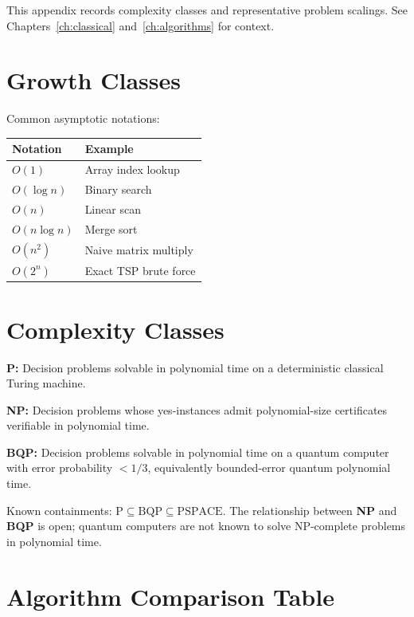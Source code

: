 This appendix records complexity classes and representative problem scalings. See Chapters~\ref{ch:classical} and~\ref{ch:algorithms} for context.

\section{Growth Classes}

Common asymptotic notations:
\begin{center}
\begin{tabular}{@{}ll@{}}
\toprule
Notation & Example \\
\midrule
$O(1)$ & Array index lookup \\
$O(\log n)$ & Binary search \\
$O(n)$ & Linear scan \\
$O(n\log n)$ & Merge sort \\
$O(n^2)$ & Naive matrix multiply \\
$O(2^n)$ & Exact TSP brute force \\
\bottomrule
\end{tabular}
\end{center}

\section{Complexity Classes}

\textbf{P:} Decision problems solvable in polynomial time on a deterministic classical Turing machine.

\textbf{NP:} Decision problems whose yes-instances admit polynomial-size certificates verifiable in polynomial time.

\textbf{BQP:} Decision problems solvable in polynomial time on a quantum computer with error probability $<1/3$, equivalently bounded-error quantum polynomial time.

Known containments: $\mathrm{P}\subseteq\mathrm{BQP}\subseteq\mathrm{PSPACE}$. The relationship between \textbf{NP} and \textbf{BQP} is open; quantum computers are not known to solve NP-complete problems in polynomial time.

\section{Algorithm Comparison Table}

